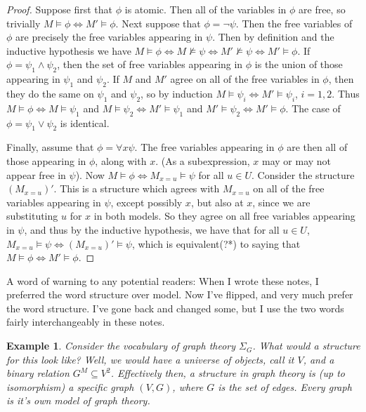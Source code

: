 \documentclass{article}
\theoremstyle{definition}
\theoremstyle{plain}
\newtheorem{example}{Example}[section]
\theoremstyle{theorem}
\begin{document}
\begin{proof}
    Suppose first that $\phi$ is atomic. Then all of the variables in $\phi$ are free, so trivially $M \models \phi \iff M' \models \phi$. Next suppose that $\phi = \neg \psi$. Then the free variables of $\phi$ are precisely the free variables appearing in $\psi$. Then by definition and the inductive hypothesis we have $M \models \phi \iff M \nvDash \psi \iff M' \nvDash \psi \iff M' \models \phi$. If $\phi = \psi_1 \wedge \psi_2$, then the set of free variables appearing in $\phi$ is the union of those appearing in $\psi_1$ and $\psi_2$. If $M$ and $M'$ agree on all of the free variables in $\phi$, then they do the same on $\psi_1$ and $\psi_2$, so by induction $M \models \psi_i \iff M' \models \psi_i$, $i=1,2$. Thus $M \models \phi \iff M \models \psi_1$ and $M \models \psi_2 \iff M' \models \psi_1$ and $M' \models \psi_2 \iff M' \models \phi$. The case of $\phi = \psi_1 \vee \psi_2$ is identical.
    \par Finally, assume that $\phi = \forall x \psi$. The free variables appearing in $\phi$ are then all of those appearing in $\phi$, along with $x$. (As a subexpression, $x$ may or may not appear free in $\psi$). Now $M \models \phi \iff M_{x=u} \models \psi$ for all $u \in U$. Consider the structure $(M_{x=u})'$. This is a structure which agrees with $M_{x=u}$ on all of the free variables appearing in $\psi$, except possibly $x$, but also at $x$, since we are substituting $u$ for $x$ in both models. So they agree on all free variables appearing in $\psi$, and thus by the inductive hypothesis, we have that for all $u \in U$, $M_{x=u} \models \psi \iff (M_{x=u})' \models \psi$, which is equivalent(?*) to saying that $M \models \phi \iff M' \models \phi$. 
\end{proof}
A word of warning to any potential readers: When I wrote these notes, I preferred the word structure over model. Now I've flipped, and very much prefer the word structure. I've gone back and changed some, but I use the two words fairly interchangeably in these notes.
\begin{example}
    Consider the vocabulary of graph theory $\Sigma_G$. What would a structure for this look like? Well, we would have a universe of objects, call it $V$, and a binary relation $G^M \subseteq V^2$. Effectively then, a structure in graph theory is (up to isomorphism) a specific graph $(V,G)$, where $G$ is the set of edges. \textit{Every graph is it's own model of graph theory}. 
\end{example}
\end{document}
